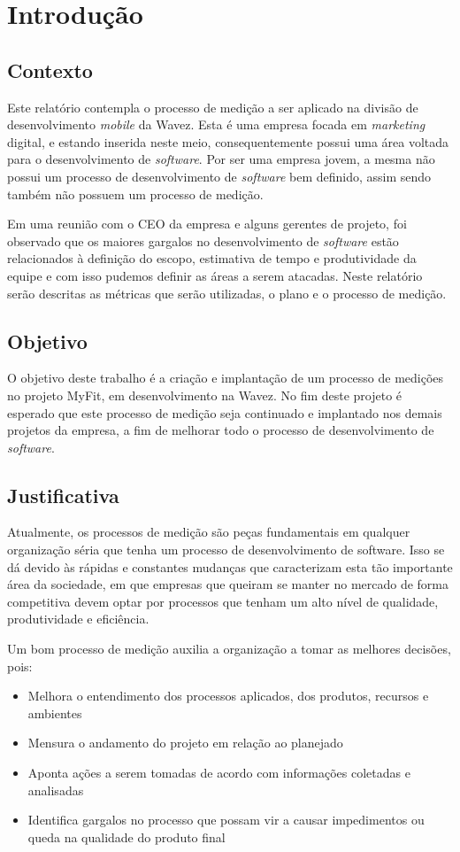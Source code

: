 \chapter{Introdução}
\section{Contexto}
Este relatório contempla o processo de medição a ser aplicado na divisão de desenvolvimento \textit{mobile} da Wavez. Esta é uma empresa focada em \textit{marketing} digital, e estando inserida neste meio, consequentemente possui uma área voltada para o desenvolvimento de \textit{software}. Por ser uma empresa jovem, a mesma não possui um processo de desenvolvimento de \textit{software} bem definido, assim sendo também não possuem um processo de medição.

Em uma reunião com o CEO da empresa e alguns gerentes de projeto, foi observado que os maiores gargalos no desenvolvimento de \textit{software} estão relacionados à definição do escopo, estimativa de tempo e produtividade da equipe e com isso pudemos definir as áreas a serem atacadas. Neste relatório serão descritas as métricas que serão utilizadas, o plano e o processo de medição.
\section{Objetivo}
O objetivo deste trabalho é a criação e implantação de um processo de medições no projeto MyFit, em desenvolvimento na Wavez. No fim deste projeto é esperado que este processo de medição seja continuado e implantado nos demais projetos da empresa, a fim de melhorar todo o processo de desenvolvimento de \textit{software}.
\section{Justificativa}
Atualmente, os processos de medição são peças fundamentais em qualquer organização séria que tenha um processo de desenvolvimento de software. Isso se dá devido às rápidas e constantes mudanças que caracterizam esta tão importante área da sociedade, em que empresas que queiram se manter no mercado de forma competitiva devem optar por processos que tenham um alto nível de qualidade, produtividade e eficiência.

Um bom processo de medição auxilia a organização a tomar as melhores decisões, pois:
\begin{itemize}
\item Melhora o entendimento dos processos aplicados, dos produtos, recursos e ambientes
\item Mensura o andamento do projeto em relação ao planejado
\item Aponta ações a serem tomadas de acordo com informações coletadas e analisadas
\item Identifica gargalos no processo que possam vir a causar impedimentos ou queda na qualidade do produto final
\end{itemize}

